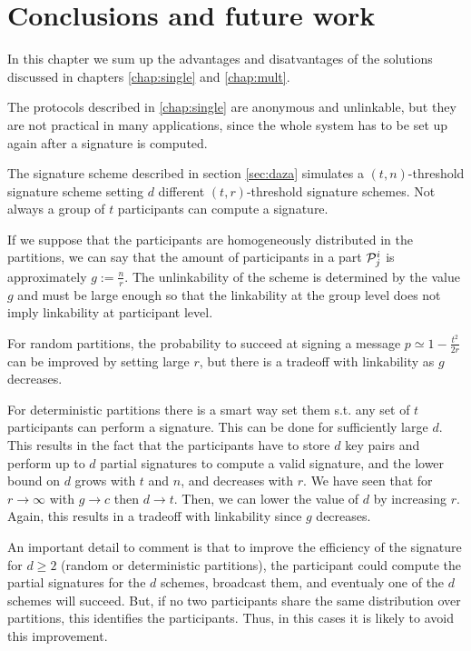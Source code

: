 \chapter{Conclusions and future work}
\label{chap:conc}
In this chapter we sum up the advantages and disatvantages of the solutions discussed in chapters \ref{chap:single} and \ref{chap:mult}.

The protocols described in \ref{chap:single} are anonymous and unlinkable, but they are not practical in many applications, since the whole system has to be set up again after a signature is computed.

The signature scheme described in section \ref{sec:daza} simulates a $(t,n)$-threshold signature scheme setting $d$ different $(t,r)$-threshold signature schemes. Not always a group of $t$ participants can compute a signature.

If we suppose that the participants are homogeneously distributed in the partitions, we can say that the amount of participants in a part ${\mathcal P}^i_j$ is approximately $g:=\frac{n}{r}$. The unlinkability of the scheme is determined by the value $g$ and must be large enough so that the linkability at the group level does not imply linkability at participant level.

For random partitions, the probability to succeed at signing a message $p \simeq 1 - \frac{t^2}{2r}$ can be improved by setting large $r$, but there is a tradeoff with linkability as $g$ decreases. 

For deterministic partitions there is a smart way set them s.t. any set of $t$ participants can perform a signature. This can be done for sufficiently large $d$. This results in the fact that the participants have to store $d$ key pairs and perform up to $d$ partial signatures to compute a valid signature, and the lower bound on $d$ grows with $t$ and $n$, and decreases with $r$. We have seen that for $r \rightarrow \infty$ with $g \rightarrow c$ then $d \rightarrow t$. Then, we can lower the value of $d$ by increasing $r$. Again, this results in a tradeoff with linkability since $g$ decreases.

An important detail to comment is that to improve the efficiency of the signature for $d \geq 2$ (random or deterministic partitions), the participant could compute the partial signatures for the $d$ schemes, broadcast them, and eventualy one of the $d$ schemes will succeed. But, if no two participants share the same distribution over partitions, this identifies the participants. Thus, in this cases it is likely to avoid this improvement.

